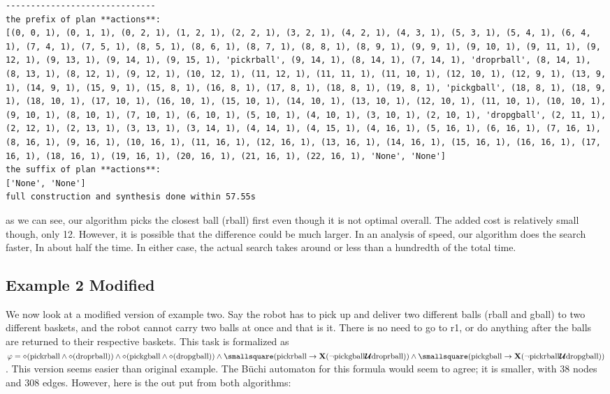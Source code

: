 \begin{lstlisting}
------------------------------
the prefix of plan **actions**:
[(0, 0, 1), (0, 1, 1), (0, 2, 1), (1, 2, 1), (2, 2, 1), (3, 2, 1), (4, 2, 1), (4, 3, 1), (5, 3, 1), (5, 4, 1), (6, 4, 1), (7, 4, 1), (7, 5, 1), (8, 5, 1), (8, 6, 1), (8, 7, 1), (8, 8, 1), (8, 9, 1), (9, 9, 1), (9, 10, 1), (9, 11, 1), (9, 12, 1), (9, 13, 1), (9, 14, 1), (9, 15, 1), 'pickrball', (9, 14, 1), (8, 14, 1), (7, 14, 1), 'droprball', (8, 14, 1), (8, 13, 1), (8, 12, 1), (9, 12, 1), (10, 12, 1), (11, 12, 1), (11, 11, 1), (11, 10, 1), (12, 10, 1), (12, 9, 1), (13, 9, 1), (14, 9, 1), (15, 9, 1), (15, 8, 1), (16, 8, 1), (17, 8, 1), (18, 8, 1), (19, 8, 1), 'pickgball', (18, 8, 1), (18, 9, 1), (18, 10, 1), (17, 10, 1), (16, 10, 1), (15, 10, 1), (14, 10, 1), (13, 10, 1), (12, 10, 1), (11, 10, 1), (10, 10, 1), (9, 10, 1), (8, 10, 1), (7, 10, 1), (6, 10, 1), (5, 10, 1), (4, 10, 1), (3, 10, 1), (2, 10, 1), 'dropgball', (2, 11, 1), (2, 12, 1), (2, 13, 1), (3, 13, 1), (3, 14, 1), (4, 14, 1), (4, 15, 1), (4, 16, 1), (5, 16, 1), (6, 16, 1), (7, 16, 1), (8, 16, 1), (9, 16, 1), (10, 16, 1), (11, 16, 1), (12, 16, 1), (13, 16, 1), (14, 16, 1), (15, 16, 1), (16, 16, 1), (17, 16, 1), (18, 16, 1), (19, 16, 1), (20, 16, 1), (21, 16, 1), (22, 16, 1), 'None', 'None']
the suffix of plan **actions**:
['None', 'None']
full construction and synthesis done within 57.55s 
\end{lstlisting}
as we can see, our algorithm picks the closest ball (rball) first even though it is not optimal overall. The added cost is relatively small though, only 12. However, it is possible that the difference could be much larger. In an analysis of speed, our algorithm does the search faster, In about half the time. In either case, the actual search takes around or less than a hundredth of the total time.

\subsection{Example 2 Modified}
We now look at a modified version of example two. Say the robot has to pick up and deliver two different balls (rball and gball) to two different baskets, and the robot cannot carry two balls at once and that is it. There is no need to go to r1, or do anything after the balls are returned to their respective baskets. This task is formalized as $\varphi = \diamond (\text{pickrball} \wedge \diamond (\text{droprball})) \wedge \diamond(\text{pickgball} \wedge \diamond (\text{dropgball})) \wedge \smallsquare (\text{pickrball} \rightarrow \textbf{X}(\neg \text{pickgball} \U \text{droprball})) \wedge \smallsquare (\text{pickgball} \rightarrow \\ \textbf{X} (\neg \text{pickrball} \U \text{dropgball}))$. This version seems easier than original example. The B\"uchi automaton for this formula would seem to agree; it is smaller, with 38 nodes and 308 edges. However, here is the out put from both algorithms:

